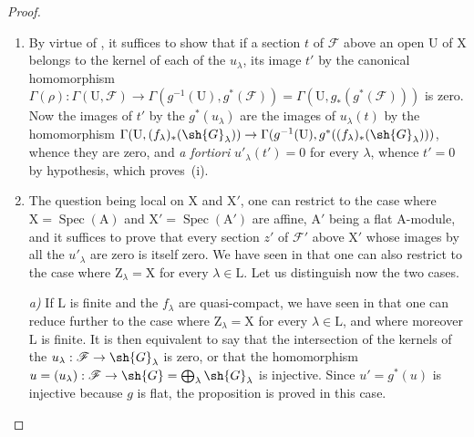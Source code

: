 \begin{proof}
\begin{enumerate}[label=(\roman*)]
  \item By virtue of , it suffices to show that if a section $t$ of $\mathscr{F}$ above an open $\mathrm{U}$ of $\mathrm{X}$ belongs to the kernel of each of the $u_\lambda$, its image $t'$ by the canonical homomorphism $\Gamma(\rho):\Gamma(\mathrm{U},\mathscr{F})\to\Gamma(g^{-1}(\mathrm{U}),g^*(\mathscr{F}))=\Gamma(\mathrm{U},g_*(g^*(\mathscr{F})))$ is zero.
  Now the images of $t'$ by the $g^*(u_\lambda)$ are the images of $u_\lambda(t)$ by the homomorphism $\Gamma(\mathrm{U},(f_\lambda)_*(\sh{G}_\lambda))\to\Gamma(g^{-1}(\mathrm{U}),g^*((f_\lambda)_*(\sh{G}_\lambda)))$, whence they are zero, and \emph{a fortiori} $u'_\lambda(t')=0$ for every $\lambda$, whence $t'=0$ by hypothesis, which proves~(i).

  \item The question being local on $\mathrm{X}$ and $\mathrm{X}'$, one can restrict to the case where $\mathrm{X}=\operatorname{Spec}(\mathrm{A})$ and $\mathrm{X}'=\operatorname{Spec}(\mathrm{A}')$ are affine, $\mathrm{A}'$ being a flat $\mathrm{A}$-module, and it suffices to prove that every section $z'$ of $\mathscr{F}'$ above $\mathrm{X}'$ whose images by all the $u'_\lambda$ are zero is itself zero.
  We have seen in  that one can also restrict to the case where $\mathrm{Z}_\lambda=\mathrm{X}$ for every $\lambda\in\mathrm{L}$.
  Let us distinguish now the two cases.
  \medskip

  \emph{a)} If $\mathrm{L}$ is finite and the $f_\lambda$ are quasi-compact, we have seen in  that one can reduce further to the case where $\mathrm{Z}_\lambda=\mathrm{X}$ for every $\lambda\in\mathrm{L}$, and where moreover $\mathrm{L}$ is finite.
  It is then equivalent to say that the intersection of the kernels of the $u_\lambda:\mathscr{F}\to\sh{G}_\lambda$ is zero, or that the homomorphism $u=(u_\lambda):\mathscr{F}\to\sh{G}=\bigoplus_\lambda\sh{G}_\lambda$ is injective.
  Since $u'=g^*(u)$ is injective because $g$ is flat, the proposition is proved in this case.


\end{enumerate}
\end{proof}
